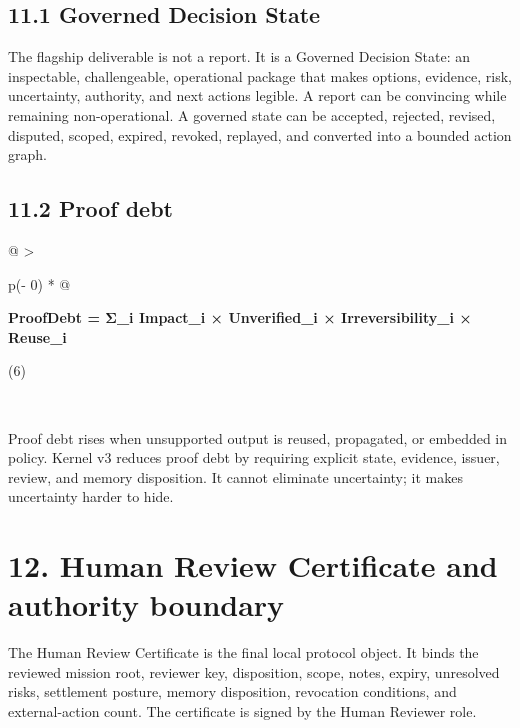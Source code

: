 \subsection{11.1 Governed Decision State}\label{governed-decision-state}

The flagship deliverable is not a report. It is a Governed Decision
State: an inspectable, challengeable, operational package that makes
options, evidence, risk, uncertainty, authority, and next actions
legible. A report can be convincing while remaining non-operational. A
governed state can be accepted, rejected, revised, disputed, scoped,
expired, revoked, replayed, and converted into a bounded action graph.

\subsection{11.2 Proof debt}\label{proof-debt}

\begin{longtable}[]{@{}
  >{\raggedright\arraybackslash}p{(\columnwidth - 0\tabcolsep) * }@{}}
\toprule\noalign{}
\begin{minipage}[b]{\linewidth}\raggedright
\textbf{ProofDebt = Σ\_\allowbreak{}i Impact\_\allowbreak{}i × Unverified\_\allowbreak{}i × Irreversibility\_\allowbreak{}i
× Reuse\_\allowbreak{}i}

(6)
\end{minipage} \\
\midrule\noalign{}
\endhead
\bottomrule\noalign{}
\endlastfoot
\end{longtable}

Proof debt rises when unsupported output is reused, propagated, or
embedded in policy. Kernel v3 reduces proof debt by requiring explicit
state, evidence, issuer, review, and memory disposition. It cannot
eliminate uncertainty; it makes uncertainty harder to hide.

\section{12. Human Review Certificate and authority
boundary}\label{human-review-certificate-and-authority-boundary}

The Human Review Certificate is the final local protocol object. It
binds the reviewed mission root, reviewer key, disposition, scope,
notes, expiry, unresolved risks, settlement posture, memory disposition,
revocation conditions, and external-action count. The certificate is
signed by the Human Reviewer role.

